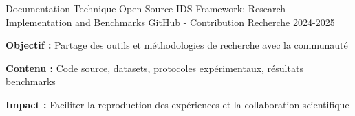 \begin{cventries}
    \cventry
    {Documentation Technique}
    {Open Source IDS Framework: Research Implementation and Benchmarks} %
    {GitHub - Contribution Recherche} %
    {2024-2025} %
    {
        \begin{cvitems} %
            \item {\textbf{Objectif :} Partage des outils et méthodologies de recherche avec la communauté}
            \item {\textbf{Contenu :} Code source, datasets, protocoles expérimentaux, résultats benchmarks}
            \item {\textbf{Impact :} Faciliter la reproduction des expériences et la collaboration scientifique}
        \end{cvitems}
    }

\end{cventries}
